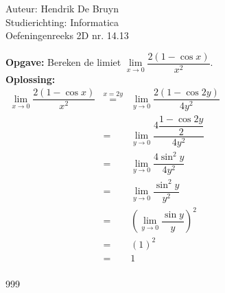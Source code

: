 \documentclass[a4paper]{article}
\begin{document}
  
\noindent \large Auteur: Hendrik De Bruyn \\
\noindent \large Studierichting: Informatica\\
\noindent \large Oefeningenreeks 2D nr. 14.13\\

\medskip

\normalsize

\textbf{Opgave:} Bereken de limiet $\lim\limits_{x \rightarrow 0} \dfrac{2(1-\cos x)}{x^2}$. \\

\textbf{Oplossing:} \\

$\begin{array}{rcl}
\lim\limits_{x \rightarrow 0} \dfrac{2(1-\cos x)}{x^2}
&\overset{x = 2y}{=}& \lim\limits_{y \rightarrow 0} \dfrac{2(1-\cos 2y)}{4y^2} \\
&=& \lim\limits_{y \rightarrow 0} \dfrac{4\dfrac{1-\cos 2y}{2}}{4y^2} \\
&=& \lim\limits_{y \rightarrow 0} \dfrac{4\sin^2 y}{4y^2} \\
&=& \lim\limits_{y \rightarrow 0} \dfrac{\sin^2 y}{y^2} \\
&=& \left(\lim\limits_{y \rightarrow 0} \dfrac{\sin y}{y}\right)^2 \\
&=& (1)^2 \\
&=& 1 \\
\end{array}
$

\begin{thebibliography}{999}
\end{thebibliography}
\end{document}
